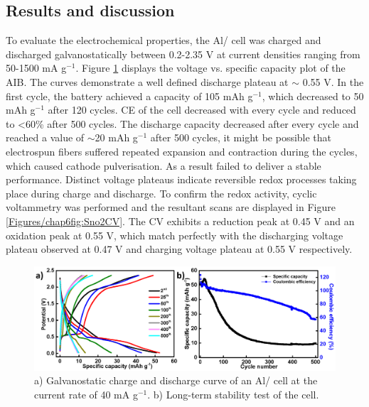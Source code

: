 \subsection{Results and discussion}
To evaluate the electrochemical properties, the Al/ cell was charged and discharged galvanostatically between 0.2-2.35 V at current densities ranging from 50-1500 mA g$^{-1}$. Figure \ref{Figures/chap6fig:SnO2newCDC} displays the voltage vs. specific capacity plot of the AIB. The curves demonstrate a well defined discharge plateau at $\sim$ 0.55 V. In the first cycle, the battery achieved a capacity of 105 mAh g$^{-1}$, which decreased to 50 mAh g$^{-1}$ after 120 cycles. CE of the cell decreased with every cycle and reduced to <60\% after 500 cycles. The discharge capacity decreased after every cycle and reached a value of $\sim$20 mAh g$^{-1}$ after 500 cycles, it might be possible that electrospun fibers suffered repeated expansion and contraction during the cycles, which caused cathode pulverisation. As a result  failed to deliver a stable performance. Distinct voltage plateaus indicate reversible redox processes taking place during charge and discharge. To confirm the redox activity, cyclic voltammetry was performed and the resultant scans are displayed in Figure \ref{Figures/chap6fig:Sno2CV}. The CV exhibits a reduction peak at 0.45 V and an oxidation peak at 0.55 V, which match perfectly with the discharging voltage plateau observed at 0.47 V and charging voltage plateau at 0.55 V respectively.    

 \begin{figure}[th!]
  \centering
  \includegraphics[width=\textwidth]{Figures/chap6fig/SnO2newCDC}
    \caption{a) Galvanostatic charge and discharge curve of an Al/ cell at the current rate of 40 mA g$^{-1}$. b) Long-term stability test of the cell.}
  \label{Figures/chap6fig:SnO2newCDC}
\end{figure}

